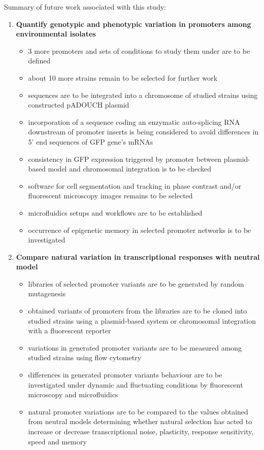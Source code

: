 Summary of future work associated with this study:

\begin{enumerate}

    \item \textbf{Quantify genotypic and phenotypic variation in promoters among environmental  isolates}
    
    \begin{itemize}
    
        \item 3 more promoters and sets of conditions to study them under are to be defined
        \item about 10 more strains remain to be selected for further work
        \item {} sequences are to be integrated into a chromosome of studied strains using constructed pADOUCH plasmid
        \item incorporation of a sequence coding an enzymatic auto-splicing RNA downstream of promoter inserts is being considered to avoid differences in 5' end sequences of GFP gene's mRNAs
        \item consistency in GFP expression triggered by  promoter between plasmid-based model and chromosomal integration is to be checked
        \item software for cell segmentation and tracking in phase contrast and/or fluorescent microscopy images remains to be selected
        \item microfluidics setups and workflows are to be established
        \item occurrence of epigenetic memory in selected promoter networks is to be investigated
            
    \end{itemize}
    
    \item \textbf{Compare natural variation in transcriptional responses with neutral model}
    
    \begin{itemize}
    
        \item libraries of selected promoter variants are to be generated by random mutagenesis
        \item obtained variants of promoters from the libraries are to be cloned into studied strains using a plasmid-based system or chromosomal integration with a fluorescent reporter
        \item variations in generated promoter variants are to be measured among studied strains using flow cytometry
        \item differences in generated promoter variants behaviour are to be investigated under dynamic and fluctuating conditions by fluorescent microscopy and microfluidics
        \item natural promoter variations are to be compared to the values obtained from neutral models determining whether natural selection has acted to increase or decrease transcriptional noise, plasticity, response sensitivity, speed and memory
    

\end{itemize}
\end{enumerate}
